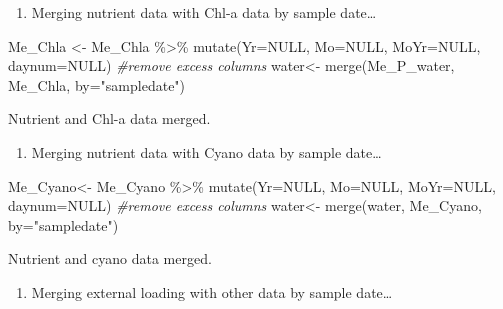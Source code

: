 \documentclass[
]{article}
\newenvironment{Shaded}{\begin{snugshade}}{\end{snugshade}}
\newcommand{\AttributeTok}[1]{\textcolor[rgb]{0.77,0.63,0.00}{#1}}
\newcommand{\CommentTok}[1]{\textcolor[rgb]{0.56,0.35,0.01}{\textit{#1}}}
\newcommand{\ConstantTok}[1]{\textcolor[rgb]{0.00,0.00,0.00}{#1}}
\newcommand{\FunctionTok}[1]{\textcolor[rgb]{0.00,0.00,0.00}{#1}}
\newcommand{\NormalTok}[1]{#1}
\newcommand{\OtherTok}[1]{\textcolor[rgb]{0.56,0.35,0.01}{#1}}
\newcommand{\SpecialCharTok}[1]{\textcolor[rgb]{0.00,0.00,0.00}{#1}}
\newcommand{\StringTok}[1]{\textcolor[rgb]{0.31,0.60,0.02}{#1}}
\providecommand{\tightlist}{%
  \setlength{\itemsep}{0pt}\setlength{\parskip}{0pt}}
\begin{document}
\begin{enumerate}
\def\labelenumi{\alph{enumi})}
\tightlist
\item
  Merging nutrient data with Chl-a data by sample date\ldots{}
\end{enumerate}

\begin{Shaded}
\begin{Highlighting}[]
\NormalTok{Me\_Chla }\OtherTok{\textless{}{-}}\NormalTok{ Me\_Chla }\SpecialCharTok{\%\textgreater{}\%}
  \FunctionTok{mutate}\NormalTok{(}\AttributeTok{Yr=}\ConstantTok{NULL}\NormalTok{, }\AttributeTok{Mo=}\ConstantTok{NULL}\NormalTok{, }\AttributeTok{MoYr=}\ConstantTok{NULL}\NormalTok{, }\AttributeTok{daynum=}\ConstantTok{NULL}\NormalTok{) }\CommentTok{\#remove excess columns}
\NormalTok{water}\OtherTok{\textless{}{-}} \FunctionTok{merge}\NormalTok{(Me\_P\_water, Me\_Chla, }\AttributeTok{by=}\StringTok{"sampledate"}\NormalTok{)}
\end{Highlighting}
\end{Shaded}

Nutrient and Chl-a data merged.

\begin{enumerate}
\def\labelenumi{\alph{enumi})}
\setcounter{enumi}{1}
\tightlist
\item
  Merging nutrient data with Cyano data by sample date\ldots{}
\end{enumerate}

\begin{Shaded}
\begin{Highlighting}[]
\NormalTok{Me\_Cyano}\OtherTok{\textless{}{-}}\NormalTok{ Me\_Cyano }\SpecialCharTok{\%\textgreater{}\%}
  \FunctionTok{mutate}\NormalTok{(}\AttributeTok{Yr=}\ConstantTok{NULL}\NormalTok{, }\AttributeTok{Mo=}\ConstantTok{NULL}\NormalTok{, }\AttributeTok{MoYr=}\ConstantTok{NULL}\NormalTok{, }\AttributeTok{daynum=}\ConstantTok{NULL}\NormalTok{) }\CommentTok{\#remove excess columns}
\NormalTok{water}\OtherTok{\textless{}{-}} \FunctionTok{merge}\NormalTok{(water, Me\_Cyano, }\AttributeTok{by=}\StringTok{"sampledate"}\NormalTok{)}
\end{Highlighting}
\end{Shaded}

Nutrient and cyano data merged.

\begin{enumerate}
\def\labelenumi{\alph{enumi})}
\setcounter{enumi}{2}
\tightlist
\item
  Merging external loading with other data by sample date\ldots{}
\end{enumerate}
\end{document}
